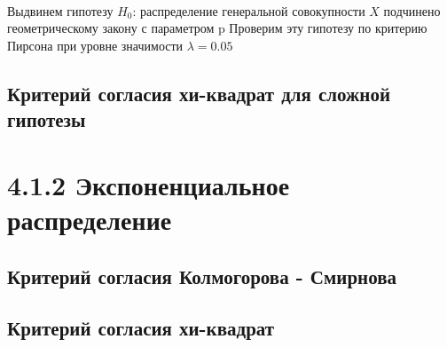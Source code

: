 \documentclass[a4paper,12pt, oneside]{book}
\begin{document}
\begin{figure}[h!]
\begin{center}
\begin{minipage}[h]{0.47\linewidth}
		\end{minipage}
		\hfill
		\begin{minipage}[h]{0.47\linewidth}
			\\
		\end{minipage}
	\end{center}
\end{figure}


Выдвинем гипотезу $ H_0 $: распределение генеральной совокупности $ X $ подчинено геометрическому закону с параметром p Проверим эту гипотезу по критерию Пирсона при уровне значимости $ \lambda  = 0.05 $


\subsection{Критерий согласия хи-квадрат для сложной гипотезы}


\newpage
\section{4.1.2 Экспоненциальное распределение}

\subsection{Критерий согласия Колмогорова - Смирнова}

\subsection{Критерий согласия хи-квадрат}
\end{document}

